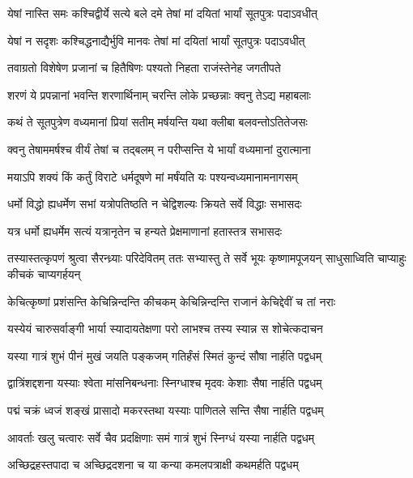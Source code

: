 \twolineshloka
{येषां नास्ति समः कश्चिद्वीर्ये सत्ये बले दमे}
{तेषां मां दयितां भार्यां सूतपुत्रः पदाऽवधीत्}


\twolineshloka
{येषां न सदृशः कश्चिद्धनाद्यैर्भुवि मानवः}
{तेषां मां दयितां भार्यां सूतपुत्रः पदाऽवधीत्}


\twolineshloka
{तवाग्रतो विशेषेण प्रजानां च हितैषिणः}
{पश्यतो निहता राजंस्तेनेह जगतीपते}


\twolineshloka
{शरणं ये प्रपन्नानां भवन्ति शरणार्थिनाम्}
{चरन्ति लोके प्रच्छन्नाः क्वनु तेऽद्य महाबलाः}


\twolineshloka
{कथं ते सूतपुत्रेण वध्यमानां प्रियां सतीम्}
{मर्षयन्ति यथा क्लीबा बलवन्तोऽतितेजसः}


\twolineshloka
{क्वनु तेषाममर्षश्च वीर्यं तेषां च तद्बलम्}
{न परीप्सन्ति ये भार्यां वध्यमानां दुरात्माना}


\twolineshloka
{मयाऽपि शक्यं किं कर्तुं विराटे धर्मदूषणे}
{मां मर्षंयति यः पश्यन्वध्यमानामनागसम्}


\twolineshloka
{धर्मो विद्धो ह्यधर्मेण सभां यत्रोपतिष्ठति}
{न चेद्विशल्यः क्रियते सर्वे विद्धाः सभासदः}


\twolineshloka
{यत्र धर्मो ह्यधर्मेम सत्यं यत्रानृतेन च}
{हन्यते प्रेक्षमाणानां हतास्तत्र सभासदः}



\threelineshloka
{तस्यास्तत्कृपणं श्रुत्वा सैरन्ध्र्याः परिदेवितम्}
{ततः सभ्यास्तु ते सर्वे भूयः कृष्णामपूजयन्}
{साधुसाध्विति चाप्याहुः कीचकं चाप्यगर्हयन्}


\twolineshloka
{केचित्कृष्णां प्रशंसन्ति केचिन्निन्दन्ति कीचकम्}
{केचिन्निन्दन्ति राजानं केचिद्देवीं च तां नराः}




\twolineshloka
{यस्येयं चारुसर्वाङ्गी भार्या स्यादायतेक्षणा}
{परो लाभश्च तस्य स्यान्न स शोचेत्कदाचन}


\twolineshloka
{यस्या गात्रं शुभं पीनं मुखं जयति पङ्कजम्}
{गतिर्हंसं स्मितं कुन्दं सौषा नार्हति पद्वधम्}


\twolineshloka
{द्वात्रिंशद्दशना यस्याः श्वेता मांसनिबन्धनाः}
{स्निग्धाश्च मृदवः केशाः सैषा नार्हति पद्वधम्}


\twolineshloka
{पद्मं चक्रं ध्वजं शङ्खं प्रासादो मकरस्तथा}
{यस्याः पाणितले सन्ति सैषा नार्हति पद्वधम्}


\twolineshloka
{आवर्ताः खलु चत्वारः सर्वे चैव प्रदक्षिणाः}
{समं गात्रं शुभं स्निग्धं यस्या नार्हति पद्वधम्}


\twolineshloka
{अच्छिद्रहस्तपादा च अच्छिद्रदशना च या}
{कन्या कमलपत्राक्षी कथमर्हति पद्वधम्}


